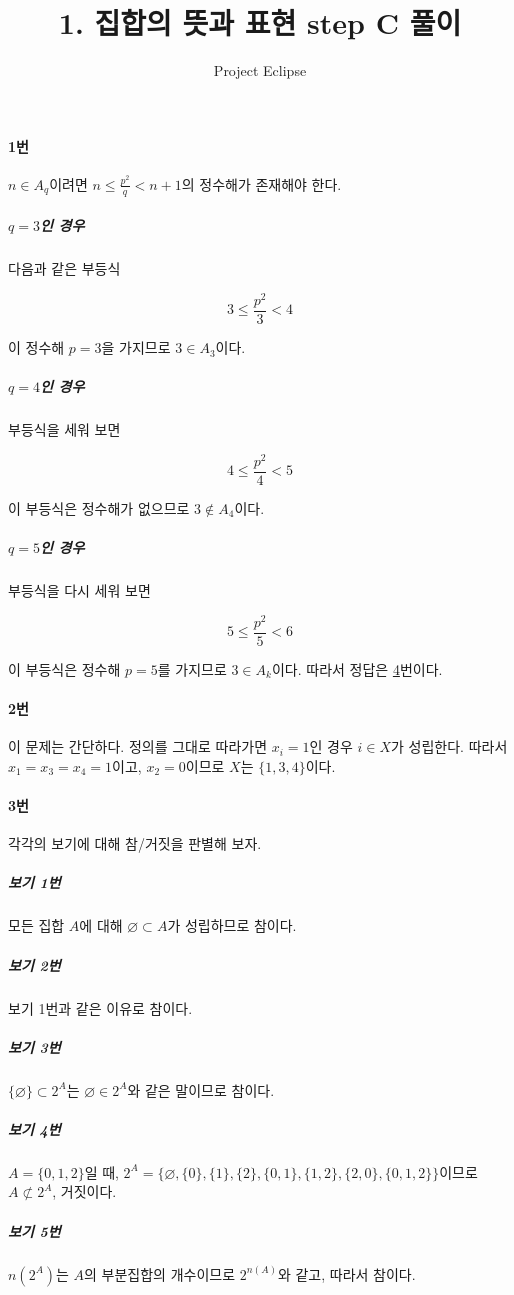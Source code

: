 \documentclass{article}
\title{1. 집합의 뜻과 표현 step C 풀이}
\author{Project Eclipse}
\date{}
\begin{document}
\maketitle
\paragraph{1번}
$n \in A_q$이려면 $n \le \frac{p^2}{q} < n + 1$의 정수해가 존재해야 한다.

\subparagraph{$q = 3$인 경우}
다음과 같은 부등식

\[
3 \le \frac{p^2}{3} < 4
\]

이 정수해 $p = 3$을 가지므로 $3 \in A_3$이다.

\subparagraph{$q = 4$인 경우}
부등식을 세워 보면

\[
4 \le \frac{p^2}{4} < 5
\]

이 부등식은 정수해가 없으므로 $3 \notin A_4$이다.

\subparagraph{$q = 5$인 경우}
부등식을 다시 세워 보면

\[
5 \le \frac{p^2}{5} < 6
\]

이 부등식은 정수해 $p = 5$를 가지므로 $3 \in A_k$이다. 따라서 정답은 \underline{4}번이다.

\paragraph{2번}
이 문제는 간단하다. 정의를 그대로 따라가면 $x_i = 1$인 경우 $i \in X$가 성립한다. \newline 따라서 $x_1 = x_3 = x_4 = 1$이고, $x_2 = 0$이므로 $X$는 \underline{$\{1, 3, 4\}$}이다.

\paragraph{3번}
각각의 보기에 대해 참/거짓을 판별해 보자.

\subparagraph{보기 1번}
모든 집합 $A$에 대해 $\varnothing \subset A$가 성립하므로 참이다.

\subparagraph{보기 2번}
보기 1번과 같은 이유로 참이다.

\subparagraph{보기 3번}
$\{ \varnothing \} \subset 2^A$는 $\varnothing \in 2^A$와 같은 말이므로 참이다.

\subparagraph{보기 4번}
$A = \{0, 1, 2\}$일 때, $2^A = \{\varnothing, \{0\}, \{1\}, \{2\}, \{0, 1\}, \{1, 2\}, \{2, 0\}, \{0, 1, 2\}\}$이므로 $A \not\subset 2^A$, 거짓이다.

\subparagraph{보기 5번}
$n(2^A)$는 $A$의 부분집합의 개수이므로 $2^{n(A)}$와 같고, 따라서 참이다. \newline
\end{document}
